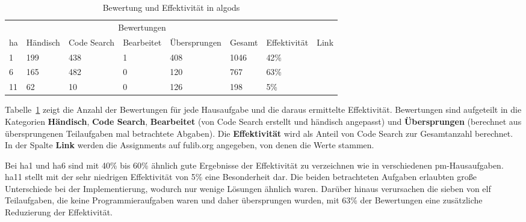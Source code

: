 \renewcommand{\thefootnote}{\alph{footnote}}
\begin{table}
    \centering
    \caption{Bewertung und Effektivität in \ac{algods}}
    \begin{tabular}{|l|l|l|l|l|l|l|l|}
    \hline
        ~ & \multicolumn{5}{c|}{Bewertungen} & ~ & ~ \\
        \acs{ha} & Händisch & Code Search & Bearbeitet & Übersprungen & Gesamt & Effektivität & Link \\ \hline
        1  & 199 & 438 & 1 & 408 & 1046 & 42\% & \footnotemark[1] \\ \hline
        6  & 165 & 482 & 0 & 120 &  767 & 63\% & \footnotemark[2] \\ \hline
        11 &  62 &  10 & 0 & 126 &  198 & 5\% & \footnotemark[3] \\ \hline
    \end{tabular}
    \label{tbl:algods-effectiveness}
\end{table}
\renewcommand{\thefootnote}{\arabic{footnote}}

Tabelle~\ref{tbl:algods-effectiveness} zeigt die Anzahl der Bewertungen für jede Hausaufgabe und die daraus ermittelte Effektivität.
Bewertungen sind aufgeteilt in die Kategorien \textbf{Händisch}, \textbf{Code Search}, \textbf{Bearbeitet} (von Code Search erstellt und händisch angepasst) und \textbf{Übersprungen} (berechnet aus übersprungenen Teilaufgaben mal betrachtete Abgaben).
Die \textbf{Effektivität} wird als Anteil von Code Search zur Gesamtanzahl berechnet.
In der Spalte \textbf{Link} werden die Assignments auf fulib.org angegeben, von denen die Werte stammen.

Bei \ac{ha}1 und \ac{ha}6 sind mit 40\% bis 60\% ähnlich gute Ergebnisse der Effektivität zu verzeichnen wie in verschiedenen \ac{pm}-Hausaufgaben.
\ac{ha}11 stellt mit der sehr niedrigen Effektivität von 5\% eine Besonderheit dar.
Die beiden betrachteten Aufgaben erlaubten große Unterschiede bei der Implementierung, wodurch nur wenige Lösungen ähnlich waren.
Darüber hinaus verursachen die sieben von elf Teilaufgaben, die keine Programmieraufgaben waren und daher übersprungen wurden, mit 63\% der Bewertungen eine zusätzliche Reduzierung der Effektivität.

